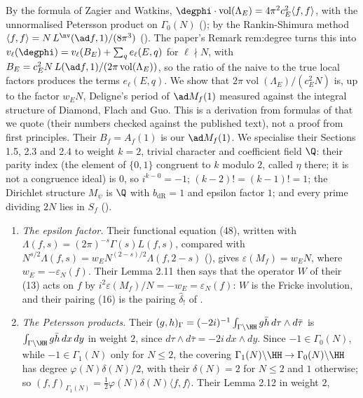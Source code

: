 \begin{remark}\label{rem:blochkato:degree-as-l-value}
By the formula of Zagier and Watkins, $\degphi\cdot\operatorname{vol}(\Lambda_E)=4\pi^2c_E^2\langle f,f\rangle$, with the unnormalised Petersson product on $\Gamma_0(N)$ (); by the
Rankin-Shimura method $\langle f,f\rangle=N\,L^{\nv}(\ad f,1)/(8\pi^3)$ (). The paper's Remark rem:degree turns this into
$v_\ell(\degphi)=v_\ell(B_E)+\sum_qe_\ell(E,q)$ for $\ell\nmid N$, with $B_E=c_E^2N\,L(\ad f,1)/(2\pi\operatorname{vol}(\Lambda_E))$, so the ratio of the naive to the true local factors produces the
terms $e_\ell(E,q)$. We show that $2\pi\operatorname{vol}(\Lambda_E)/(c_E^2N)$ is, up to the factor $w_EN$, Deligne's period of $\ad M_f(1)$ measured against the integral structure of Diamond, Flach
and Guo. This is a derivation from formulas of \cite{DFG04} that we quote (their numbers checked against the published text), not a proof from first principles. Their $B_f=A_f(1)$ is our
$\ad M_f(1)$. We specialise their Sections 1.5, 2.3 and 2.4 to weight $k=2$, trivial character and coefficient field $\Q$: their parity index (the element of $\{0,1\}$ congruent to $k$
modulo $2$, called $\eta$ there; it is not a congruence ideal) is $0$, so $i^{k-0}=-1$; $(k-2)!=(k-1)!=1$; the Dirichlet structure $M_\psi$ is $\Q$ with $b_{\mathrm{dR}}=1$ and epsilon
factor $1$; and every prime dividing $2N$ lies in $S_f$ ().
\begin{enumerate}[label=(\alph*)]
\item \emph{The epsilon factor.} Their functional equation (48), written with $\Lambda(f,s)=(2\pi)^{-s}\Gamma(s)L(f,s)$, compared with $N^{s/2}\Lambda(f,s)=w_EN^{(2-s)/2}\Lambda(f,2-s)$
(), gives $\varepsilon(M_f)=w_EN$, where $w_E=-\varepsilon_N(f)$. Their Lemma 2.11 then says that the operator $W$ of their (13) acts on $f$ by
$i^2\varepsilon(M_f)/N=-w_E=\varepsilon_N(f)$: $W$ is the Fricke involution, and their pairing (16) is the pairing $\hat\delta_!$ of .
\item \emph{The Petersson products.} Their $(g,h)_\Gamma=(-2i)^{-1}\int_{\Gamma\backslash\HH}g\bar h\,d\tau\wedge d\bar\tau$ is $\int_{\Gamma\backslash\HH}g\bar h\,dx\,dy$ in weight $2$, since
$d\tau\wedge d\bar\tau=-2i\,dx\wedge dy$. Since $-1\in\Gamma_0(N)$, while $-1\in\Gamma_1(N)$ only for $N\le2$, the covering $\Gamma_1(N)\backslash\HH\to\Gamma_0(N)\backslash\HH$ has degree
$\varphi(N)\delta(N)/2$, with their $\delta(N)=2$ for $N\le2$ and $1$ otherwise; so $(f,f)_{\Gamma_1(N)}=\frac12\varphi(N)\delta(N)\langle f,f\rangle$. Their Lemma 2.12 in weight $2$,

\end{enumerate}
\end{remark}
